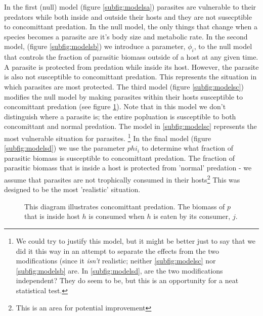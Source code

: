 \documentclass[11pt]{amsart}
\begin{document}
In the first (null) model (figure \ref{subfig:modelsa}) parasites are vulnerable to their predators while both inside and outside their hosts and they are not susecptible to concomittant predation.  In the null model, the only things that change when a species becomes a parasite are it's body size and metabolic rate.  In the second model, (figure \ref{subfig:modelsb})  we introduce a parameter, $\phi_i$, to the null model that controls the fraction of parasitic biomass outside of a host at any given time.  A parasite is protected from predation while inside its host.  However, the parasite is also not susceptible to concomittant predation.  This represents the situation in which parasites are most protected.  The third model (figure \ref{subfig:modelsc}) modifies the null model by making parasites within their hosts susceptible to concomittant predation (see figure \ref{fig:concDiagram}).  Note that in this model we don't distinguish where a parasite is; the entire popluation is susceptible to both concomittant and normal predation.  The model in \ref{subfig:modelsc} represents the most vulnerable situation for parasites. \footnote{We could try to justify this model, but it might be better just to say that we did it this way in an attempt to separate the effects from the two modifications (since it \textit{isn't} realistic; neither \ref{subfig:modelsc} nor \ref{subfig:modelsb} are. In \ref{subfig:modelsd}, are the two modifications independent?  They do seem to be, but this is an opportunity for a neat statistical test.}  In the final model (figure \ref{subfig:modelsd}) we use the parameter $phi_i$ to determine what fraction of parasitic biomass is susceptible to concomittant predation.  The fraction of parasitic biomass that is inside a host is protected from 'normal' predation - we assume that parasites are not trophically consumed in their hosts\footnote{This is an area for potential improvement}  This was designed to be the most 'realistic' situation.


\begin{figure}
\caption{This diagram illustrates concomittant predation.  The biomass of $p$ that is inside host $h$ is consumed when $h$ is eaten by its consumer, $j$. \label{fig:concDiagram}}
\end{figure}
\end{document}
